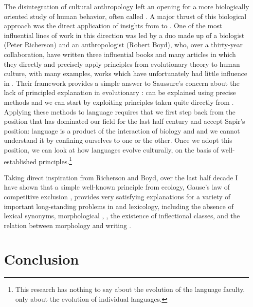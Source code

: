 \documentclass[output=paper,
modfonts
]{LSP/langsci}
\begin{document}
The disintegration of cultural anthropology left an opening for a more biologically oriented study of human behavior, often called . A major thrust of this biological approach was the direct application of insights from  to . One of the most influential lines of work in this direction was led by a duo made up of a biologist (Peter Richerson) and an anthropologist (Robert Boyd), who, over a thirty-year collaboration, have written three influential books \citep{boydandricherson1985,boydandricherson2005,Richersonandboyd2005} and many articles in which they directly and precisely apply principles from evolutionary theory to human culture, with many examples, works which have unfortunately had little influence in . Their framework provides a simple answer to Saussure's concern about the lack of principled explanation in evolutionary :  can be explained using precise methods and we can start by exploiting principles taken quite directly from .  Applying these methods to language requires that we first step back from the position that has dominated our field for the last half century and accept Sapir's position: language is a product of the interaction of biology and  and we cannot understand it by confining ourselves to one or the other.  Once we adopt this position, we can look at how languages evolve culturally, on the basis of well-established principles.\footnote{This research has nothing to say about the evolution of the language faculty, only about the evolution of individual languages.}

Taking direct inspiration from Richerson and Boyd, over the last half decade I have shown that a simple well-known principle from ecology, Gause's law of competitive exclusion \citep{Lotka1925,Volterra1926,Volterra1931,Gause1934}, provides very satisfying explanations for a variety of important long-standing problems in  and lexicology, including the absence of lexical synonyms, morphological , , the existence of inflectional classes, and the relation between morphology and writing \citep{lindsayandaronoff2013,aronoffandlindsay2015,aronoff2016,bergandaronofftoappeara}.

\section{Conclusion}
\end{document}

